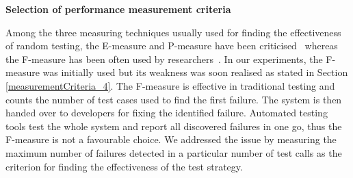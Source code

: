     







\textbf{Selection of performance measurement criteria}

Among the three measuring techniques usually used for finding the effectiveness of random testing, the E-measure and P-measure have been criticised~\cite{chen2005adaptive, chen2007quasi, chan2006restricted} whereas the F-measure has been often used by researchers~\cite{chen2004statistical, chen1996expected}. In our experiments, the F-measure was initially used but its weakness was soon realised as stated in Section \ref{measurementCriteria_4}. The F-measure is effective in traditional testing and counts the number of test cases used to find the first failure. The system is then handed over to developers for fixing the identified failure. Automated testing tools test the whole system and report all discovered failures in one go, thus the F-measure is not a favourable choice. We addressed the issue by measuring the maximum number of failures detected in a particular number of test calls as the criterion for finding the effectiveness of the test strategy.\\










